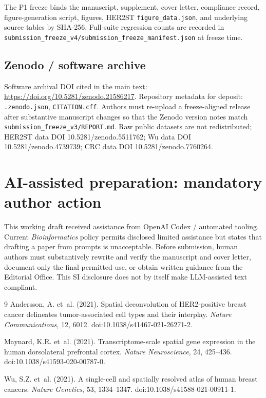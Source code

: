 \documentclass[11pt]{article}
\begin{document}
The P1 freeze binds the manuscript, supplement, cover letter, compliance
record, figure-generation script, figures, HER2ST \texttt{figure\_data.json},
and underlying source tables by SHA-256. Full-suite regression counts are
recorded in \texttt{submission\_freeze\_v4/submission\_freeze\_manifest.json}
at freeze time.

\subsection{Zenodo / software archive}

Software archival DOI cited in the main text:
\url{https://doi.org/10.5281/zenodo.21586217}.
Repository metadata for deposit: \texttt{.zenodo.json}, \texttt{CITATION.cff}.
Authors must re-upload a freeze-aligned release after substantive manuscript
changes so that the Zenodo version notes match
\texttt{submission\_freeze\_v3/REPORT.md}. Raw public datasets are not
redistributed; HER2ST data DOI 10.5281/zenodo.5511762; Wu data DOI
10.5281/zenodo.4739739; CRC data DOI 10.5281/zenodo.7760264.

\section{AI-assisted preparation: mandatory author action}

This working draft received assistance from OpenAI Codex / automated tooling.
Current \textit{Bioinformatics} policy permits disclosed limited assistance
but states that drafting a paper from prompts is unacceptable. Before
submission, human authors must substantively rewrite and verify the manuscript
and cover letter, document only the final permitted use, or obtain written
guidance from the Editorial Office. This SI disclosure does not by itself make
LLM-assisted text compliant.

\begin{thebibliography}{9}
Andersson, A. et~al. (2021). Spatial deconvolution of HER2-positive breast
cancer delineates tumor-associated cell types and their interplay.
\emph{Nature Communications}, 12, 6012.
doi:10.1038/s41467-021-26271-2.

Maynard, K.R. et~al. (2021). Transcriptome-scale spatial gene expression in
the human dorsolateral prefrontal cortex. \emph{Nature Neuroscience}, 24,
425--436. doi:10.1038/s41593-020-00787-0.

Wu, S.Z. et~al. (2021). A single-cell and spatially resolved atlas of human
breast cancers. \emph{Nature Genetics}, 53, 1334--1347.
doi:10.1038/s41588-021-00911-1.
\end{thebibliography}
\end{document}
